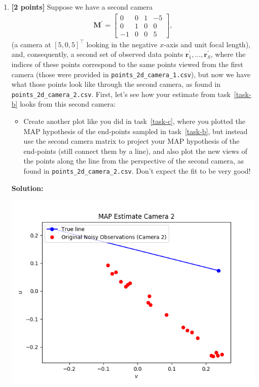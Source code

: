 \documentclass[10pt]{article}
\begin{document}
\begin{enumerate}
\item \label{task-e} {\bf [2 points]} Suppose we have a second camera
\begin{eqnarray*}
\mathbf{M}^{\prime} =
\begin{bmatrix}
0 & 0 & 1 & -5 \\
0 & 1 & 0 & 0 \\
-1 & 0 & 0 & 5
\end{bmatrix} ,
\end{eqnarray*}
(a camera at $[5, 0, 5]^{\top}$ looking in the negative $x$-axis and unit focal length), 
and, consequently, a second set of observed data points $\mathbf{r}^{\prime}_1, ..., \mathbf{r}^{\prime}_S$, where the indices of these points correspond to the same points viewed from the first camera (those were provided in {\tt points\_2d\_camera\_1.csv}), but now we have what those points look like through the second camera, as found in {\tt points\_2d\_camera\_2.csv}.  First, let's see how your estimate from task~\ref{task-b} looks from this second camera:
\begin{itemize}
\item Create another plot like you did in task~\ref{task-c}, where you plotted the MAP hypothesis of the end-points sampled in task~\ref{task-b}, but instead use the second camera matrix to project your MAP hypothesis of the end-points (still connect them by a line), and also plot the new views of the points along the line from the perspective of the second camera, as found in {\tt points\_2d\_camera\_2.csv}.  Don't expect the fit to be very good!


\end{itemize}

\textbf{Solution:}

\includegraphics{figures/map_cam2.png}


\end{enumerate}
\end{document}
